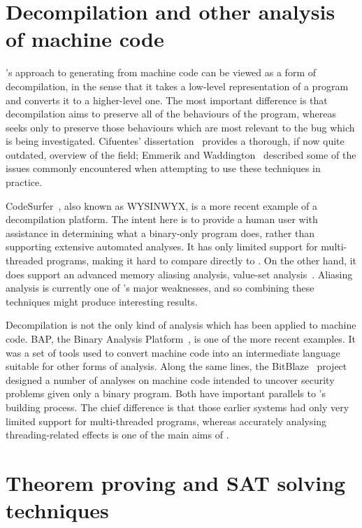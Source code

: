 \section{Decompilation and other analysis of machine code}

{\Technique}'s approach to generating {\StateMachines} from machine
code can be viewed as a form of decompilation, in the sense that it
takes a low-level representation of a program and converts it to a
higher-level one.  The most important difference is that decompilation
aims to preserve all of the behaviours of the program, whereas
{\technique} seeks only to preserve those behaviours which are most
relevant to the bug which is being investigated.  Cifuentes'
dissertation~\cite{Cifuentes1994} provides a thorough, if now quite
outdated, overview of the field; Emmerik and
Waddington~\cite{Emmerik2004} described some of the issues commonly
encountered when attempting to use these techniques in practice.

CodeSurfer~\cite{Balakrishnan2008,Balakrishnan2005a}, also known as
WYSINWYX, is a more recent example of a decompilation platform.  The
intent here is to provide a human user with assistance in determining
what a binary-only program does, rather than supporting extensive
automated analyses.  It has only limited support for multi-threaded
programs, making it hard to compare directly to {\technique}.  On the
other hand, it does support an advanced memory aliasing analysis,
value-set analysis~\cite{Balakrishnan2004}.  Aliasing analysis is
currently one of {\technique}'s major weaknesses, and so combining
these techniques might produce interesting results.

Decompilation is not the only kind of analysis which has been applied
to machine code.  BAP, the Binary Analysis
Platform~\cite{Brumley2011}, is one of the more recent examples.  It
was a set of tools used to convert machine code into an intermediate
language suitable for other forms of analysis.  Along the same lines,
the BitBlaze~\cite{Song2008} project designed a number of analyses on
machine code intended to uncover security problems given only a binary
program.  Both have important parallels to {\technique}'s
{\StateMachine} building process.  The chief difference is that those
earlier systems had only very limited support for multi-threaded
programs, whereas accurately analysing threading-related effects is
one of the main aims of {\technique}.

\section{Theorem proving and SAT solving techniques}

